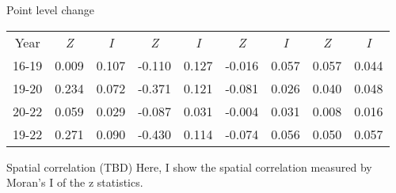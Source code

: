 \documentclass[aspectratio=169,xcolor=dvipsnames]{beamer}
\begin{document}
\begin{frame}{Point level change}
\begin{table}[]
\begin{tabular}{lllllllll}
	\multicolumn{1}{c}{Year} & \multicolumn{1}{c}{\textit{Z}} & \multicolumn{1}{c}{\textit{I}} & \multicolumn{1}{c}{\textit{Z}} & \multicolumn{1}{c}{\textit{I}} & \multicolumn{1}{c}{\textit{Z}} & \multicolumn{1}{c}{\textit{I}} & \multicolumn{1}{c}{\textit{Z}} & \multicolumn{1}{c}{\textit{I}} \\
	16-19                    & 0.009                          & 0.107                          & -0.110                         & 0.127                          & -0.016                         & 0.057                          & 0.057                          & 0.044                          \\
	19-20                    & 0.234                          & 0.072                          & -0.371                         & 0.121                          & -0.081                         & 0.026                          & 0.040                          & 0.048                          \\
	20-22                    & 0.059                          & 0.029                          & -0.087                         & 0.031                          & -0.004                         & 0.031                          & 0.008                          & 0.016                          \\
	19-22                    & 0.271                          & 0.090                          & -0.430                         & 0.114                          & -0.074                         & 0.056                          & 0.050                          & 0.057                 \\\hline         
	\end{tabular}
\end{table}
\end{frame}
\begin{frame}{Spatial correlation (TBD)}
	Here, I show the spatial correlation measured by Moran's I of the z statistics.
\end{frame}

\end{document}
